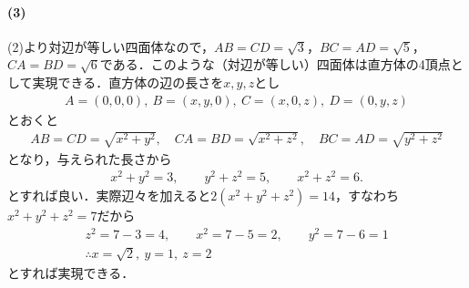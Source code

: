 \documentclass[../../main.tex]{subfiles}
\begin{document}
\paragraph{(3)}

(2)より対辺が等しい四面体なので，$AB=CD=\sqrt{3}$，$BC=AD=\sqrt{5}$，$CA=BD=\sqrt{6}$である．このような（対辺が等しい）四面体は直方体の4頂点として実現できる．直方体の辺の長さを$x,y,z$とし
\begin{align}
  A=(0,0,0),\ B=(x,y,0),\ C=(x,0,z),\ D=(0,y,z)
\end{align}
とおくと
\begin{align}
  AB=CD=\sqrt{x^2+y^2},\quad CA=BD=\sqrt{x^2+z^2},\quad BC=AD=\sqrt{y^2+z^2}
\end{align}
となり，与えられた長さから
\begin{align}
  x^2+y^2=3,\qquad y^2+z^2=5,\qquad x^2+z^2=6.
\end{align}
とすれば良い．実際辺々を加えると$2(x^2+y^2+z^2)=14$，すなわち$x^2+y^2+z^2=7$だから
\begin{align}
  z^2=7-3=4,\qquad x^2=7-5=2,\qquad y^2=7-6=1 \\
  \therefore
  x=\sqrt{2},\ y=1,\ z=2 \label{eq:2}
\end{align}
とすれば実現できる．
\end{document}
